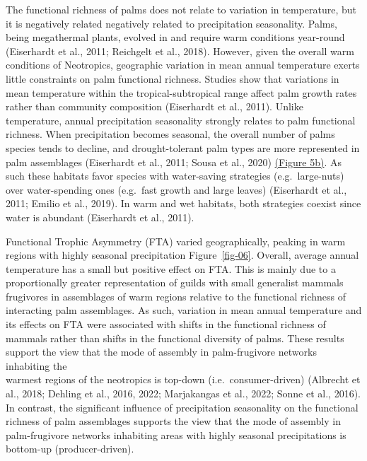 \documentclass[
]{agujournal2019}
\begin{document}
The functional richness of palms does not relate to variation in
temperature, but it is negatively related negatively related to
precipitation seasonality. Palms, being megathermal plants, evolved in
and require warm conditions year-round (Eiserhardt et al., 2011;
Reichgelt et al., 2018). However, given the overall warm conditions of
Neotropics, geographic variation in mean annual temperature exerts
little constraints on palm functional richness. Studies show that
variations in mean temperature within the tropical-subtropical range
affect palm growth rates rather than community composition (Eiserhardt
et al., 2011). Unlike temperature, annual precipitation seasonality
strongly relates to palm functional richness. When precipitation becomes
seasonal, the overall number of palms species tends to decline, and
drought-tolerant palm types are more represented in palm assemblages
(Eiserhardt et al., 2011; Sousa et al., 2020) \hyperref[fig-05]{(Figure
5b)}. As such these habitats favor species with water-saving strategies
(e.g.~large-nuts) over water-spending ones (e.g.~fast growth and large
leaves) (Eiserhardt et al., 2011; Emilio et al., 2019). In warm and wet
habitats, both strategies coexist since water is abundant (Eiserhardt et
al., 2011).

Functional Trophic Asymmetry (FTA) varied geographically, peaking in
warm regions with highly seasonal precipitation Figure~\ref{fig-06}.
Overall, average annual temperature has a small but positive effect on
FTA. This is mainly due to a proportionally greater representation of
guilds with small generalist mammals frugivores in assemblages of warm
regions relative to the functional richness of interacting palm
assemblages. As such, variation in mean annual temperature and its
effects on FTA were associated with shifts in the functional richness of
mammals rather than shifts in the functional diversity of palms. These
results support the view that the mode of assembly in palm-frugivore
networks inhabiting the\\
warmest regions of the neotropics is top-down (i.e.~consumer-driven)
(Albrecht et al., 2018; Dehling et al., 2016, 2022; Marjakangas et al.,
2022; Sonne et al., 2016). In contrast, the significant influence of
precipitation seasonality on the functional richness of palm assemblages
supports the view that the mode of assembly in palm-frugivore networks
inhabiting areas with highly seasonal precipitations is bottom-up
(producer-driven).
\end{document}
